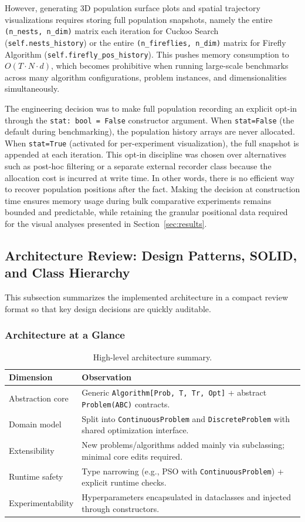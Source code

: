However, generating 3D population surface plots and spatial trajectory visualizations requires storing full population snapshots, namely the entire \texttt{(n\_nests, n\_dim)} matrix each iteration for Cuckoo Search (\texttt{self.nests\_history}) or the entire \texttt{(n\_fireflies, n\_dim)} matrix for Firefly Algorithm (\texttt{self.firefly\_pos\_history}). This pushes memory consumption to $O(T \cdot N \cdot d)$, which becomes prohibitive when running large-scale benchmarks across many algorithm configurations, problem instances, and dimensionalities simultaneously.

The engineering decision was to make full population recording an explicit opt-in through the \texttt{stat: bool = False} constructor argument. When \texttt{stat=False} (the default during benchmarking), the population history arrays are never allocated. When \texttt{stat=True} (activated for per-experiment visualization), the full snapshot is appended at each iteration. This opt-in discipline was chosen over alternatives such as post-hoc filtering or a separate external recorder class because the allocation cost is incurred at write time. In other words, there is no efficient way to recover population positions after the fact. Making the decision at construction time ensures memory usage during bulk comparative experiments remains bounded and predictable, while retaining the granular positional data required for the visual analyses presented in Section~\ref{sec:results}.

\subsection{Architecture Review: Design Patterns, SOLID, and Class Hierarchy}
This subsection summarizes the implemented architecture in a compact review format so that key design decisions are quickly auditable.

\subsubsection{Architecture at a Glance}
\begin{table}[H]
\centering
\caption{High-level architecture summary.}
\label{tab:architecture-summary}
\begin{tabular}{p{3.2cm} p{9.3cm}}
\hline
\textbf{Dimension} & \textbf{Observation} \\
\hline
Abstraction core & Generic \texttt{Algorithm[Prob, T, Tr, Opt]} + abstract \texttt{Problem(ABC)} contracts. \\
Domain model & Split into \texttt{ContinuousProblem} and \texttt{DiscreteProblem} with shared optimization interface. \\
Extensibility & New problems/algorithms added mainly via subclassing; minimal core edits required. \\
Runtime safety & Type narrowing (e.g., PSO with \texttt{ContinuousProblem}) + explicit runtime checks. \\
Experimentability & Hyperparameters encapsulated in dataclasses and injected through constructors. \\
\hline
\end{tabular}
\end{table}

